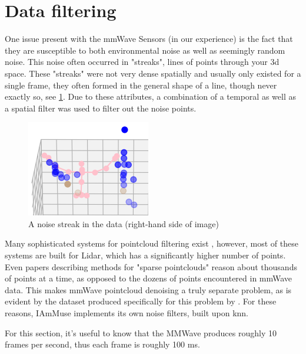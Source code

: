 \section{Data filtering}
\label{section: tracking method - data filtering}

One issue present with the mmWave Sensors (in our experience) is the fact that they are susceptible to both environmental noise as well as seemingly random noise. 
This noise often occurred in "streaks", lines of points through your 3d space. 
These "streaks" were not very dense spatially and usually only existed for a single frame, they often formed in the general shape of a line, though never exactly so, see \cref{figure: noise streak}.
Due to these attributes, a combination of a temporal as well as a spatial filter was used to filter out the noise points.

\begin{figure}
    \centering
    \includegraphics[width=0.5\linewidth]{figures/internal data/noise streak.png}
    \caption{A noise streak in the data (right-hand side of image)}
    \label{figure: noise streak}
\end{figure}

Many sophisticated systems for pointcloud filtering exist \cite{ester1996dbscan, faisal2017density}, however, most of these systems are built for Lidar, which has a significantly higher number of points. 
Even papers describing methods for "sparse pointclouds" reason about thousands of points at a time, as opposed to the dozens of points encountered in mmWave data.
This makes mmWave pointcloud denoising a truly separate problem, as is evident by the dataset produced specifically for this problem \cite{farella2019sparse} by \citeauthor{farella2019sparse}.
For these reasons, IAmMuse implements its own noise filters, built upon knn.

For this section, it's useful to know that the MMWave produces roughly 10 frames per second, thus each frame is roughly 100 ms.

